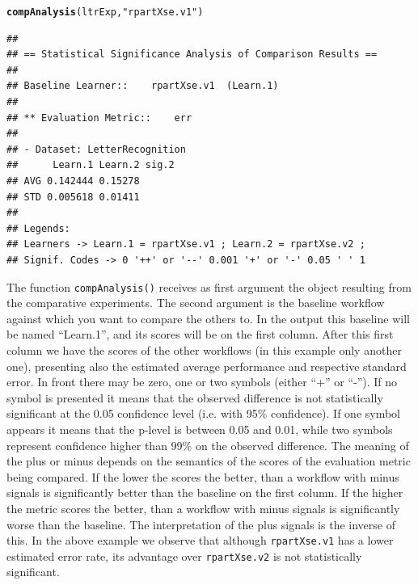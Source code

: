\documentclass[10pt,a4paper]{article}\usepackage[]{graphicx}\usepackage[]{color}
\makeatletter
\newcommand{\hlstr}[1]{\textcolor[rgb]{0.192,0.494,0.8}{#1}}%
\newcommand{\hlstd}[1]{\textcolor[rgb]{0.345,0.345,0.345}{#1}}%
\newcommand{\hlkwd}[1]{\textcolor[rgb]{0.737,0.353,0.396}{\textbf{#1}}}%
\newenvironment{kframe}{%
 \def\at@end@of@kframe{}%
 \ifinner\ifhmode%
  \def\at@end@of@kframe{\end{minipage}}%
  \begin{minipage}{\columnwidth}%
 \fi\fi%
 \def\FrameCommand##1{\hskip\@totalleftmargin \hskip-\fboxsep
 \colorbox{shadecolor}{##1}\hskip-\fboxsep
     \hskip-\linewidth \hskip-\@totalleftmargin \hskip\columnwidth}%
 \MakeFramed {\advance\hsize-\width
   \@totalleftmargin\z@ \linewidth\hsize
   \@setminipage}}%
 {\par\unskip\endMakeFramed%
 \at@end@of@kframe}
\newenvironment{knitrout}{}{} %
\makeatother
\begin{document}
\begin{knitrout}
\color{fgcolor}\begin{kframe}
\begin{alltt}
\hlkwd{compAnalysis}\hlstd{(ltrExp,} \hlstr{"rpartXse.v1"}\hlstd{)}
\end{alltt}


{\ttfamily\noindent\color{warningcolor}{\#\# Warning: cannot compute exact p-value with zeroes}}\begin{verbatim}
## 
## == Statistical Significance Analysis of Comparison Results ==
## 
## Baseline Learner::	 rpartXse.v1  (Learn.1)
## 
## ** Evaluation Metric::	 err 
## 
## - Dataset: LetterRecognition 
##      Learn.1 Learn.2 sig.2
## AVG 0.142444 0.15278      
## STD 0.005618 0.01411      
## 
## Legends:
## Learners -> Learn.1 = rpartXse.v1 ; Learn.2 = rpartXse.v2 ; 
## Signif. Codes -> 0 '++' or '--' 0.001 '+' or '-' 0.05 ' ' 1
\end{verbatim}
\end{kframe}
\end{knitrout}


The function \texttt{compAnalysis()} receives as first argument the
object resulting from the comparative experiments. The second argument
is the baseline workflow against which you want to compare the others
to. In the output this baseline will be named ``Learn.1'', and its
scores will be on the first column. After this first column we have
the scores of the other workflows (in this example only another one),
presenting also the estimated average performance and respective
standard error. In front there may be zero, one or two symbols (either
``+'' or ``-''). If no symbol is presented it means that the observed
difference is not statistically significant at the 0.05 confidence
level (i.e. with 95\% confidence). If one symbol appears it means that
the p-level is between 0.05 and 0.01, while two symbols represent
confidence higher than 99\% on the observed difference. The meaning of
the plus or minus depends on the semantics of the scores of the
evaluation metric being compared. If the lower the scores the better,
than a workflow with minus signals is significantly better than the
baseline on the first column. If the higher the metric scores the
better, than a workflow with minus signals is significantly worse than
the baseline. The interpretation of the plus signals is the inverse of
this. In the above example we observe that although
\texttt{rpartXse.v1} has a lower estimated error rate, its advantage
over \texttt{rpartXse.v2} is not statistically significant.
\end{document}

